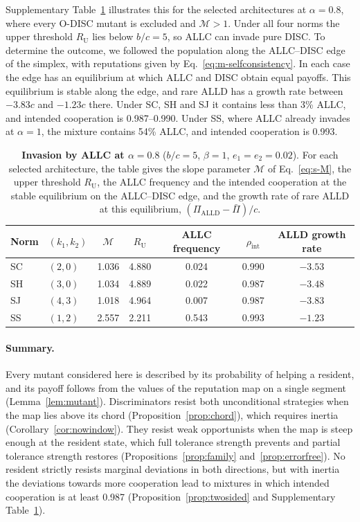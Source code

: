 \documentclass[10pt]{wlscirep}
\newcommand{\ALLD}{\mathrm{ALLD}}
\theoremstyle{plain}
\theoremstyle{remark}
\begin{document}
Supplementary Table~\ref{tab:si-generous} illustrates this for the selected architectures at $\alpha=0.8$, where every O-DISC mutant is excluded and $\mathcal M>1$. Under all four norms the upper threshold $R_{\mathrm U}$ lies below $b/c=5$, so ALLC can invade pure DISC. To determine the outcome, we followed the population along the ALLC--DISC edge of the simplex, with reputations given by Eq.~\eqref{eq:m-selfconsistency}. In each case the edge has an equilibrium at which ALLC and DISC obtain equal payoffs. This equilibrium is stable along the edge, and rare ALLD has a growth rate between $-3.83c$ and $-1.23c$ there. Under SC, SH and SJ it contains less than 3\% ALLC, and intended cooperation is 0.987--0.990. Under SS, where ALLC already invades at $\alpha=1$, the mixture contains 54\% ALLC, and intended cooperation is 0.993.

\begin{table}[!htbp]
\centering
\caption{\textbf{Invasion by ALLC at $\alpha=0.8$} ($b/c=5$, $\beta=1$, $e_1=e_2=0.02$). For each selected architecture, the table gives the slope parameter $\mathcal M$ of Eq.~\eqref{eq:s-M}, the upper threshold $R_{\mathrm U}$, the ALLC frequency and the intended cooperation at the stable equilibrium on the ALLC--DISC edge, and the growth rate of rare ALLD at this equilibrium, $(\Pi_{\ALLD}-\bar\Pi)/c$.}
\label{tab:si-generous}
\small
\begin{tabular}{@{}llccccc@{}}
\toprule
Norm & $(k_1,k_2)$ & $\mathcal M$ & $R_{\mathrm U}$ & ALLC frequency & $\rho_{\mathrm{int}}$ & ALLD growth rate\\
\midrule
SC & $(2,0)$ & 1.036 & 4.880 & 0.024 & 0.990 & $-3.53$\\
SH & $(3,0)$ & 1.034 & 4.889 & 0.022 & 0.987 & $-3.48$\\
SJ & $(4,3)$ & 1.018 & 4.964 & 0.007 & 0.987 & $-3.83$\\
SS & $(1,2)$ & 2.557 & 2.211 & 0.543 & 0.993 & $-1.23$\\
\bottomrule
\end{tabular}
\end{table}

\paragraph{Summary.} Every mutant considered here is described by its probability of helping a resident, and its payoff follows from the values of the reputation map on a single segment (Lemma~\ref{lem:mutant}). Discriminators resist both unconditional strategies when the map lies above its chord (Proposition~\ref{prop:chord}), which requires inertia (Corollary~\ref{cor:nowindow}). They resist weak opportunists when the map is steep enough at the resident state, which full tolerance strength prevents and partial tolerance strength restores (Propositions~\ref{prop:family} and~\ref{prop:errorfree}). No resident strictly resists marginal deviations in both directions, but with inertia the deviations towards more cooperation lead to mixtures in which intended cooperation is at least 0.987 (Proposition~\ref{prop:twosided} and Supplementary Table~\ref{tab:si-generous}).
\end{document}
